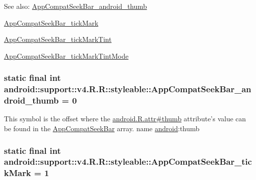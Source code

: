 \begin{Desc}
\item[See also:]\hyperlink{classandroid_1_1support_1_1v4_1_1_r_1_1styleable_b43c760130a04dcde39e22a8430f0e12}{AppCompatSeekBar\_\-android\_\-thumb} 

\hyperlink{classandroid_1_1support_1_1v4_1_1_r_1_1styleable_6e0d3bf421371768beb5be26cf3f856a}{AppCompatSeekBar\_\-tickMark} 

\hyperlink{classandroid_1_1support_1_1v4_1_1_r_1_1styleable_201e2cc7cfcab0b7c77dd7867a265808}{AppCompatSeekBar\_\-tickMarkTint} 

\hyperlink{classandroid_1_1support_1_1v4_1_1_r_1_1styleable_768563f41000484be3e1b36b3ce945e9}{AppCompatSeekBar\_\-tickMarkTintMode} \end{Desc}
\hypertarget{classandroid_1_1support_1_1v4_1_1_r_1_1styleable_b43c760130a04dcde39e22a8430f0e12}{
\subsubsection[{AppCompatSeekBar\_\-android\_\-thumb}]{\setlength{\rightskip}{0pt plus 5cm}static final int android::support::v4.R.R::styleable::AppCompatSeekBar\_\-android\_\-thumb = 0}}
\label{classandroid_1_1support_1_1v4_1_1_r_1_1styleable_b43c760130a04dcde39e22a8430f0e12}


This symbol is the offset where the \hyperlink{}{android.R.attr\#thumb} attribute's value can be found in the \hyperlink{classandroid_1_1support_1_1v4_1_1_r_1_1styleable_7fa9b523f74ed9ed71772420c84dee04}{AppCompatSeekBar} array.  name \hyperlink{namespaceandroid}{android}:thumb \hypertarget{classandroid_1_1support_1_1v4_1_1_r_1_1styleable_6e0d3bf421371768beb5be26cf3f856a}{
\subsubsection[{AppCompatSeekBar\_\-tickMark}]{\setlength{\rightskip}{0pt plus 5cm}static final int android::support::v4.R.R::styleable::AppCompatSeekBar\_\-tickMark = 1}}
\label{classandroid_1_1support_1_1v4_1_1_r_1_1styleable_6e0d3bf421371768beb5be26cf3f856a}


